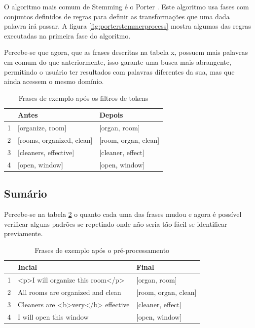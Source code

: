 O algoritmo mais comum de Stemming é o Porter \cite{porterstemming}. Este algoritmo usa fases com conjuntos definidos de regras para definir as transformações que uma dada palavra irá passar. A figura \ref{fig:porterstemmerprocess} mostra algumas das regras executadas na primeira fase do algoritmo.

Percebe-se que agora, que as frases descritas na tabela x, possuem mais palavras em comum do que anteriormente, isso garante uma busca mais abrangente, permitindo o usuário ter resultados com palavras diferentes da sua, mas que ainda acessem o mesmo domínio.

\begin{table}[htb]
	\centering
    \def\arraystretch{1.2} %
    \begin{tabular}{|l|l|l|}
        \hline
        & \textbf{Antes} & \textbf{Depois} \\ \hline
        1 & [organize, room]  & [organ, room]            \\ \hline
        2 & [rooms, organized, clean]  & [room, organ, clean] \\ \hline
        3 & [cleaners, effective]  & [cleaner, effect]                              \\ \hline
        4 & [open, window]  & [open, window]                             \\ \hline
    \end{tabular}
	\caption{Frases de exemplo após os filtros de tokens}
    \label{tab:tokenfilter}
\end{table}

\subsection{Sumário}
Percebe-se na tabela \ref{tab:allphrases} o quanto cada uma das frases mudou e agora é possível verificar alguns padrões se repetindo onde não seria tão fácil se identificar previamente.
\begin{table}[htb]
	\centering
    \def\arraystretch{1.2} %
    \begin{tabular}{|l|l|l|}
        \hline
        & \textbf{Incial} & \textbf{Final} \\ \hline
        1 & <p>I will organize this room</p>  & [organ, room]            \\ \hline
        2 & All rooms are organized and clean  & [room, organ, clean] \\ \hline
        3 & Cleaners are <b>very</b> effective  & [cleaner, effect]                              \\ \hline
        4 & I will open this window  & [open, window]                             \\ \hline
    \end{tabular}
	\caption{Frases de exemplo após o pré-processamento}
    \label{tab:allphrases}
\end{table}

